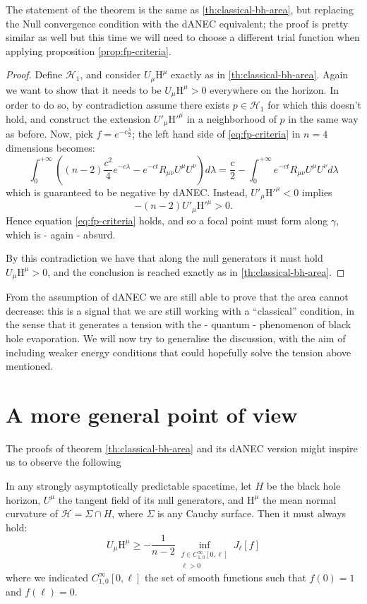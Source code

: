 The statement of the theorem is the same as \ref{th:classical-bh-area}, but replacing the Null convergence condition with the dANEC equivalent; the proof is pretty similar as well but this time we will need to choose a different trial function when applying proposition \ref{prop:fp-criteria}.
\begin{proof}
	Define \(\mathscr{H}_1\), and consider \(U_{\mu}\mathrm{H}^{\mu}\) exactly as in \ref{th:classical-bh-area}. Again we want to show that it needs to be \(U_{\mu}\mathrm{H}^{\mu} > 0\) everywhere on the horizon. In order to do so, by contradiction assume there exists \(p\in \mathscr{H}_1\) for which this doesn't hold, and construct the extension \(U'_{\mu}\mathrm{H}'^{\mu}\) in a neighborhood of \(p\) in the same way as before.
	Now, pick \(f = e^{-c\frac{\lambda}{2}}\); the left hand side of \ref{eq:fp-criteria} in \(n = 4\) dimensions becomes:
	\[
	\int_{0}^{+\infty} \left((n-2)\frac{c^2}{4} e^{-c\lambda} - e^{-ct}R_{\mu\nu}U^{\mu}U^{\nu}\right)d\lambda = \frac{c}{2} - \int_{0}^{+\infty} e^{-ct}R_{\mu\nu}U^{\mu}U^{\nu}d\lambda 
	\]
	which is guaranteed to be negative by dANEC.
	Instead, \(U'_{\mu}\mathrm{H}'^{\mu} < 0 \) implies
	\[
	-(n - 2)U'_{\mu}\mathrm{H}'^{\mu} > 0.
	\]
	Hence equation \eqref{eq:fp-criteria} holds, and so a focal point must form along \(\gamma\), which is - again - absurd. 
	
	By this contradiction we have that along the null generators it must hold \(U_{\mu}\mathrm{H}^{\mu} > 0\), and the conclusion is reached exactly as in \ref{th:classical-bh-area}.
\end{proof}

From the assumption of dANEC we are still able to prove that the area cannot decrease: this is a signal that we are still working with a ``classical'' condition, in the sense that it generates a tension with the - quantum - phenomenon of black hole evaporation. We will now try to generalise the discussion, with the aim of including weaker energy conditions that could hopefully solve the tension above mentioned.


\section{A more general point of view}

The proofs of theorem \ref{th:classical-bh-area} and its dANEC version might inspire us to observe the following
\begin{lemma}
	\label{lemma:generalized-area-theorem}
	In any strongly asymptotically predictable spacetime, let \(H\) be the black hole horizon, \(U^{\mu}\) the tangent field of its null generators, and \(\mathrm{H}^{\mu}\) the mean normal curvature of \(\mathscr{H} = \Sigma \cap H\), where \(\Sigma\) is any Cauchy surface. Then it must always hold:
	\[
	U_{\mu}\mathrm{H}^{\mu} \ge -\frac{1}{n - 2} \inf_{\substack{f\in C^{\infty}_{1,0}[0, \ell]\\ \ell > 0}}J_{\ell}[f]
	\]
	where we indicated \(C^{\infty}_{1,0}[0, \ell]\) the set of smooth functions such that \(f(0) = 1\) and \(f(\ell) = 0\).
\end{lemma}


